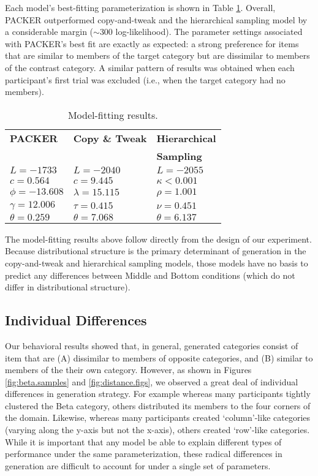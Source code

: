 \documentclass[10pt,letterpaper]{article}
\begin{document}
Each model's best-fitting parameterization is shown in Table \ref{table:model-fits}. Overall, PACKER outperformed copy-and-tweak and the hierarchical sampling model by a considerable margin ($\sim300$ log-likelihood). The parameter settings associated with PACKER's best fit are exactly as expected: a strong preference for items that are similar to members of the target category but are dissimilar to members of the contrast category. A similar pattern of results was obtained when each participant's first trial was excluded (i.e., when the target category had no members).


\begin{table}[ht!]
\centering
\caption{Model-fitting results.}
\label{table:model-fits}
\begin{tabular}{ l l l}
\\
 \textbf{PACKER} & \textbf{Copy \& Tweak} & \textbf{Hierarchical} \\
 & & \textbf{Sampling} \\ \hline
 $L = -1733$ & $L = -2040$ & $L = -2055$  \\ 
 $c=0.564$ & $c=9.445$  & $\kappa<0.001$\\
$\phi=-13.608$& $\lambda=15.115$ & $\rho=1.001$ \\ 
$\gamma=12.006$  & $\tau=0.415$ & $\nu=0.451$  \\ 
 $\theta=0.259$  & $\theta=7.068$ & $\theta=6.137$  \\ 
\end{tabular}
\end{table}

The model-fitting results above follow directly from the design of our experiment. Because distributional structure is the primary determinant of generation in the copy-and-tweak and hierarchical sampling models, those models have no basis to predict any differences between Middle and Bottom conditions (which do not differ in distributional structure). 

\subsection{Individual Differences}

Our behavioral results showed that, in general, generated categories consist of item that are (A) dissimilar to members of opposite categories, and (B) similar to members of the their own category. However, as shown in Figures \ref{fig:beta.samples} and \ref{fig:distance.figs}, we observed a great deal of individual differences in generation strategy. For example whereas many participants tightly clustered the Beta category, others distributed its members to the four corners of the domain. Likewise, whereas many participants created `column'-like categories (varying along the y-axis but not the x-axis), others created `row'-like categories. While it is important that any model be able to explain different types of performance under the same parameterization, these radical differences in generation are difficult to account for under a single set of parameters.
\end{document}
